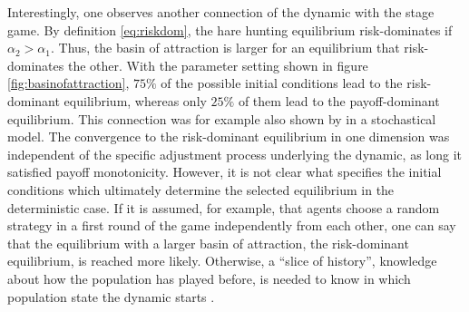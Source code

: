 Interestingly, one observes another connection of the 
dynamic with the stage game. 
By definition \eqref{eq:riskdom}, 
the hare hunting equilibrium risk-dominates if $\alpha_2 > \alpha_1$.
Thus, the basin of attraction is larger for an equilibrium that 
risk-dominates the other. With the parameter setting shown
in figure \ref{fig:basinofattraction}, $75\%$ of the possible initial 
conditions lead to the risk-dominant equilibrium, whereas only $25\%$ of 
them lead to the payoff-dominant equilibrium. This 
connection was for example also shown by \textcite{kandori_learning_1993} 
in a stochastical model. The convergence to the risk-dominant equilibrium
in one dimension was independent of the specific adjustment process 
underlying the dynamic, as long it satisfied payoff monotonicity. 
However, it is not clear what specifies the 
initial conditions which ultimately determine the selected equilibrium in 
the deterministic case. 
If it is assumed, for example, that agents choose a random strategy 
in a first round of the game independently from each other, 
one can say that the equilibrium with a 
larger basin of attraction, the risk-dominant equilibrium, is reached more 
likely. Otherwise, a ``slice of history'', knowledge about how the population
has played before, is needed to know in which population
state the dynamic starts \parencite{friedman_economic_1998}. 
